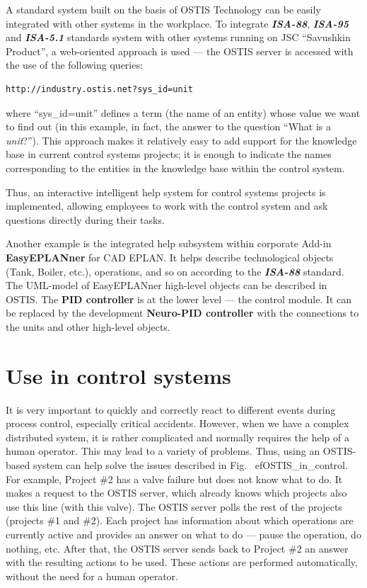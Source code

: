 A standard system built on the basis of OSTIS Technology can be easily
integrated with other systems in the workplace. To integrate
\textit{\textbf{ISA-88}}, \textit{\textbf{ISA-95}} and \textit{\textbf{ISA-5.1}}
standards system with other systems running on JSC ``Savushkin Product'', a
web-oriented approach is used --- the OSTIS server is accessed with the use of the
following queries:

\begin{lstlisting}[basicstyle=\small]
  http://industry.ostis.net?sys_id=unit
\end{lstlisting}

where ``sys\_id=unit'' defines a term (the name of an entity) whose value we want
to find out (in this example, in fact, the answer to the question ``What is a
\textit{unit}?''). This approach makes it relatively easy to add support for the
knowledge base in current control systems projects; it is enough to indicate the
names corresponding to the entities in the knowledge base within the control
system.

Thus, an interactive intelligent help system for control systems projects is
implemented, allowing employees to work with the control system and ask
questions directly during their tasks.

Another example is the integrated help subsystem within corporate Add-in
\textbf{EasyEPLANner} \cite{EasyEPLANner} for CAD EPLAN. It helps describe
technological objects (Tank, Boiler, etc.), operations, and so on according to
the \textit{\textbf{ISA-88}} standard. The UML-model of EasyEPLANner high-level
objects can be described in OSTIS. The \textbf{PID controller} is at the lower
level --- the control module. It can be replaced by the development
\textbf{Neuro-PID controller} with the connections to the units and other
high-level objects.

\section{Use in control systems}

It is very important to quickly and correctly react to different events during
process control, especially critical accidents. However, when we have a complex
distributed system, it is rather complicated and normally requires the help of a
human operator. This may lead to a variety of problems. Thus, using an
OSTIS-based system can help solve the issues described in Fig.~
ef{OSTIS_in_control}. For example, Project \#2 has a valve failure but does
not know what to do. It makes a request to the OSTIS server, which already knows
which projects also use this line (with this valve). The OSTIS server polls the
rest of the projects (projects \#1 and \#2). Each project has information about
which operations are currently active and provides an answer on what to do ---
pause the operation, do nothing, etc. After that, the OSTIS server sends back to
Project \#2 an answer with the resulting actions to be used. These actions are
performed automatically, without the need for a human operator.

